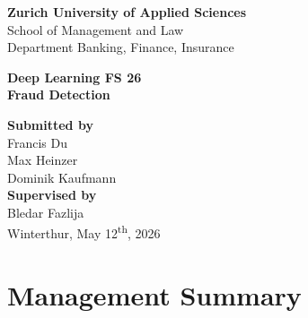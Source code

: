 \documentclass[oneside,12pt,parskip=half,american,numbers=noenddot]{scrreprt}
\renewcommand*{\chapterpagestyle}{frontmatter} %
\begin{document}
\begin{titlepage}
    \thispagestyle{empty} %
    \centering
    \vspace*{1.8cm} %

    {\large
    \textbf{Zurich University of Applied Sciences} \\
    School of Management and Law \\
    \vspace{0.4cm}
    Department Banking, Finance, Insurance \\
    }

    \vfill

    {\Large \textbf{Deep Learning FS 26}} \\[1.0cm]

    {\LARGE\bfseries
    Fraud Detection
    }

    \vfill

    {\large
    \textbf{Submitted by} \\[0.3cm]
    Francis Du \\
    Max Heinzer \\
    Dominik Kaufmann \\[1.2cm]

    \textbf{Supervised by} \\[0.3cm]
    Bledar Fazlija \\[1.4cm]

    Winterthur, May 12\textsuperscript{th}, 2026
    }

    \vspace*{1.2cm} %
\end{titlepage}

\setcounter{page}{1}

\pagestyle{frontmatter}
\renewcommand*{\chapterpagestyle}{frontmatter}

\onehalfspacing

\chapter*{Management Summary}
\thispagestyle{frontmatter}
\end{document}
